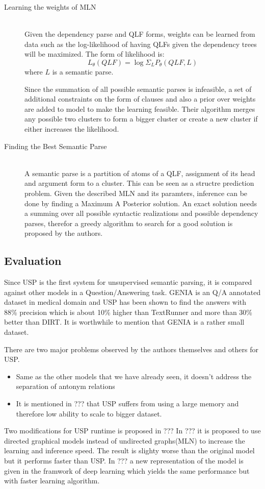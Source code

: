 \documentclass[12pt]{report}
\begin{document}
\begin{description}
  \item[Learning the weights of MLN] \hfill \\
  Given the dependency parse and QLF forms, weights can be learned from data such as the log-likelihood
  of having QLFs given the dependency trees will be maximized. The form of likelihood is:
  $$ L_{\theta}(QLF) = \log{\Sigma_L{P_\theta{(QLF, L)}}}$$ where $L$ is a semantic parse.
  
  Since the summation of all possible semantic parses is infeasible, a set of additional constraints on the form
  of clauses and also a prior over weights are added to model to make the learning feasible. Their algorithm
  merges any possible two clusters to form a bigger cluster or create a new cluster if either increases the likelihood.
  \item[Finding the Best Semantic Parse] \hfill \\
  A semantic parse is a partition of atoms of a QLF, assignment of its head and argument form to a cluster. 
  This can be seen as a structre prediction problem. Given the described MLN and its paramters, inference can
   be done by finding a Maximum A Posterior solution. An exact solution needs a summing over all possible syntactic realizations and
   possible dependency parses, therefor a greedy algorithm to search for a good solution is proposed 
   by the authors.   
\end{description}

\subsection {Evaluation}
\label{ch:evaluation}
Since USP is the first system for unsupervised semantic parsing, it is compared against other models in a Question/Answering task.
GENIA is an Q/A annotated dataset in medical domain and USP has been shown to find the answers with 88\% precision
which is about 10\% higher than TextRunner and more than 30\% better than DIRT. It is worthwhile to mention that
GENIA is a rather small dataset.

There are two major problems observed by the authors themselves and others for USP.
\begin{itemize}
 \item Same as the other models that we have already seen,
 it doesn't address the separation of antonym relations
 \item It is mentioned in ??? %
 that USP suffers from using a large memory and therefore low ability to scale to bigger dataset. 
 \end{itemize}
 Two modifications for USP runtime is proposed in ???%
  In ???  %
  it is proposed to use directed graphical models instead of undirected graphs(MLN) to increase the learning and inference speed.
  The result is slighty worse than the original model but it performs faster than USP.
  In ???%
  a new representation of the model is given in the framwork of deep learning which yields 
  the same performance but with faster learning algorithm.
  
\end{document}
